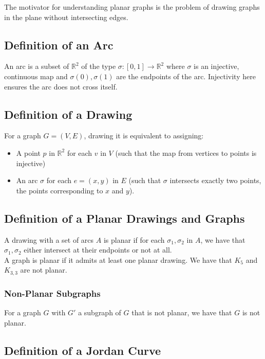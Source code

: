 \documentclass[a4paper, 12pt, twoside]{article}
\begin{document}
The motivator for understanding planar graphs is the problem of drawing graphs in
the plane without intersecting edges.

\subsection{Definition of an Arc}

An arc is a subset of $\mathbb{R}^2$ of the type $\sigma : [0, 1] \to \mathbb{R}^2$ 
where $\sigma$ is an injective, continuous map and $\sigma(0), \sigma(1)$
are the endpoints of the arc. Injectivity here ensures the arc does not cross itself.

\subsection{Definition of a Drawing}

For a graph $G = (V, E)$, drawing it is equivalent to assigning: \begin{itemize}
  \item A point $p$ in $\mathbb{R}^2$ for each $v$ in $V$ (such that the map
  from vertices to points is injective)
  \item An arc $\sigma$ for each $e = (x, y)$ in $E$ (such that $\sigma$ intersects
  exactly two points, the points corresponding to $x$ and $y$).
\end{itemize}

\subsection{Definition of a Planar Drawings and Graphs}

A drawing with a set of arcs $A$ is planar if for each $\sigma_1, \sigma_2$ in $A$, 
we have that $\sigma_1, \sigma_2$ either intersect at their endpoints or not at all.
\\[\baselineskip]
A graph is planar if it admits at least one planar drawing. We have that $K_5$ 
and $K_{3, 3}$ are not planar.

\subsubsection{Non-Planar Subgraphs}

For a graph $G$ with $G'$ a subgraph of $G$ that is not planar, we have that
$G$ is not planar.

\subsection{Definition of a Jordan Curve}
\end{document}
